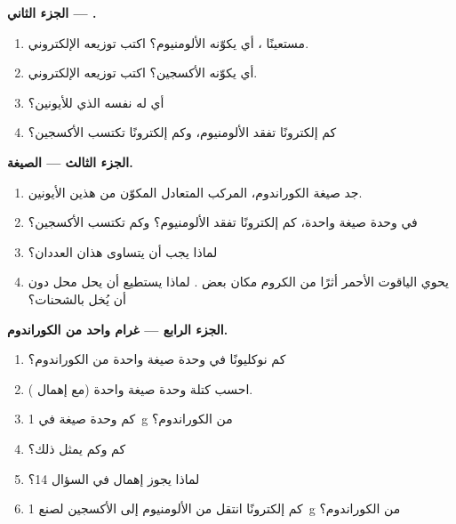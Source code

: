 \begin{problem}
\medskip
\noindent\textbf{الجزء الثاني --- .}
\begin{enumerate}[resume]
  \item مستعينًا ، أي  يكوّنه الألومنيوم؟ اكتب
        توزيعه الإلكتروني.
  \item أي  يكوّنه الأكسجين؟ اكتب توزيعه الإلكتروني.
  \item أي  له  نفسه الذي للأيونين؟
  \item كم إلكترونًا تفقد  الألومنيوم، وكم إلكترونًا تكتسب 
        الأكسجين؟
\end{enumerate}

\medskip
\noindent\textbf{الجزء الثالث --- الصيغة.}
\begin{enumerate}[resume]
  \item جد صيغة الكوراندوم، المركب المتعادل المكوّن من هذين الأيونين.
  \item في وحدة صيغة واحدة، كم إلكترونًا تفقد  الألومنيوم؟ وكم تكتسب
         الأكسجين؟
  \item لماذا يجب أن يتساوى هذان العددان؟
  \item يحوي الياقوت الأحمر أثرًا من  الكروم  مكان
        بعض  . لماذا يستطيع   أن يحل محل
          دون أن يُخل بالشحنات؟
\end{enumerate}

\medskip
\noindent\textbf{الجزء الرابع --- غرام واحد من الكوراندوم.}
\begin{enumerate}[resume]
  \item كم نوكليونًا في وحدة صيغة واحدة من الكوراندوم؟
  \item احسب كتلة وحدة صيغة واحدة (مع إهمال ).
  \item كم وحدة صيغة في \qty{1}{g} من الكوراندوم؟
  \item كم   وكم   يمثل ذلك؟
  \item لماذا يجوز إهمال  في السؤال 14؟
  \item كم إلكترونًا انتقل من الألومنيوم إلى الأكسجين لصنع \qty{1}{g} من
        الكوراندوم؟
\end{enumerate}
\end{problem}

